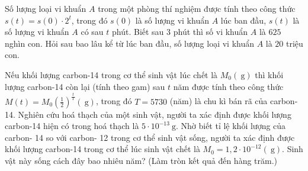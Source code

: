 \begin{ex}%
	Số lượng loại vi khuẩn $A$ trong một phòng thí nghiệm được tính theo công thức $s(t)=s(0)\cdot 2^t$, trong đó $s(0)$ là số lượng vi khuẩn $A$ lúc ban đầu, $s(t)$ là số lượng vi khuẩn $A$ có sau $t$ phút. Biết sau $3$ phút thì số vi khuẩn $A$ là $625$ nghìn con. Hỏi sau bao lâu kể từ lúc ban đầu, số lượng loại vi khuẩn $A$ là $20$ triệu con.
\end{ex}

\begin{ex}%
 Nếu khối lượng carbon-14 trong cơ thể sinh vật lúc chết là $M_0(\mathrm{~g})$ thì khối lượng carbon-14 còn lại (tính theo gam) sau $t$ năm được tính theo công thức $M(t)=M_0\left(\frac{1}{2}\right)^{\frac{t}{T}}(\mathrm{~g})$, trong đó $T=5730$ (năm) là chu kì bán rã của carbon-14. Nghiên cứu hoá thạch của một sinh vật, người ta xác định được khối lượng carbon-14 hiện có trong hoá thạch là $5 \cdot 10^{-13} \mathrm{~g}$. Nhờ biết tỉ lệ khối lượng của carbon- 14 so với carbon- 12 trong cơ thể sinh vật sống, người ta xác định được khối lượng carbon-14 trong cơ thể lúc sinh vật chết là $M_0=1,2 \cdot 10^{-12}(\mathrm{~g})$. Sinh vật này sống cách đây bao nhiêu năm? (Làm tròn kết quả đến hàng trăm.)
\end{ex}


